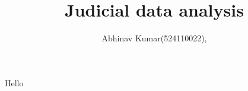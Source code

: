 \documentclass{report}
\title{Judicial data analysis}
\author{Abhinav Kumar(524110022), }
\begin{document}
\maketitle
Hello
\end{document}
